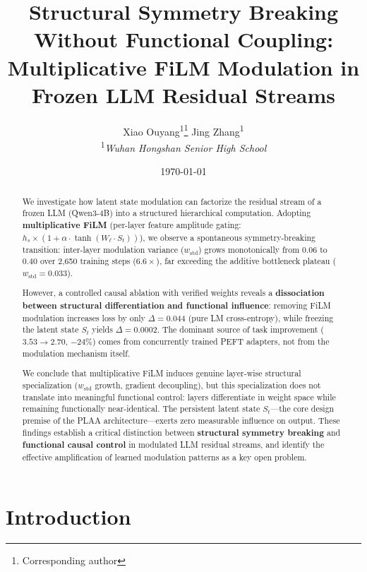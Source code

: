 \documentclass[11pt,a4paper]{article}
\title{
  \textbf{Structural Symmetry Breaking Without Functional Coupling:\\
  Multiplicative FiLM Modulation in Frozen LLM Residual Streams}
}
\author{
  Xiao Ouyang\textsuperscript{1}\thanks{Corresponding author}
  \qquad
  Jing Zhang\textsuperscript{1}
  \\[0.3em]
  \textsuperscript{1}\textit{Wuhan Hongshan Senior High School}
}
\date{\today}
\newcommand{\St}{S_t}
\begin{document}
\maketitle
\thispagestyle{empty}

\begin{abstract}
We investigate how latent state modulation can factorize the residual stream of a
frozen LLM (Qwen3-4B) into a structured hierarchical computation. Adopting
\textbf{multiplicative FiLM} (per-layer feature amplitude gating:
$h_s \times (1 + \alpha\cdot\tanh(W_\ell \cdot S_t))$), we observe a spontaneous
symmetry-breaking transition: inter-layer modulation variance ($w_{\mathrm{std}}$)
grows monotonically from $0.06$ to $0.40$ over 2,650 training steps ($6.6\times$),
far exceeding the additive bottleneck plateau ($w_{\mathrm{std}} = 0.033$).

However, a controlled causal ablation with verified weights reveals a
\textbf{dissociation between structural differentiation and functional influence}:
removing FiLM modulation increases loss by only $\Delta = 0.044$ (pure LM
cross-entropy), while freezing the latent state $\St$ yields $\Delta = 0.0002$. The
dominant source of task improvement ($3.53 \to 2.70$, $-24\%$) comes from
concurrently trained PEFT adapters, not from the modulation mechanism itself.

We conclude that multiplicative FiLM induces genuine layer-wise structural
specialization ($w_{\mathrm{std}}$ growth, gradient decoupling), but this
specialization does not translate into meaningful functional control: layers
differentiate in weight space while remaining functionally near-identical. The
persistent latent state $\St$---the core design premise of the PLAA
architecture---exerts zero measurable influence on output. These findings establish a
critical distinction between \textbf{structural symmetry breaking} and
\textbf{functional causal control} in modulated LLM residual streams, and identify
the effective amplification of learned modulation patterns as a key open problem.
\end{abstract}

\newpage
\setcounter{page}{1}

\section{Introduction}
\end{document}
